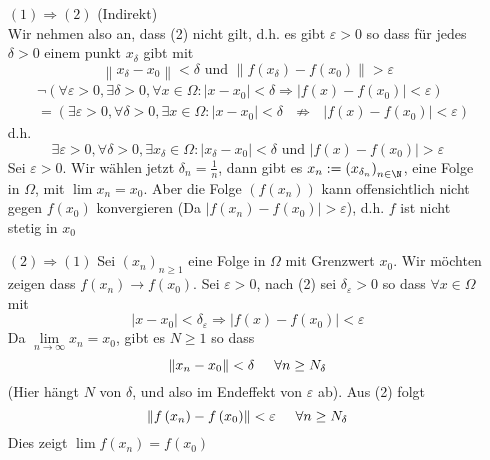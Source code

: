 \begin{beweis}{4.18}
\begin{enumerate}[align=left]
\item[$(1)\Rightarrow (2)$] (Indirekt)\\
Wir nehmen also an, dass (2) nicht gilt, d.h. es gibt $\varepsilon>0$ so dass für jedes $\delta >0$ einem punkt $x_\delta$ gibt mit 
\[\left\| {{x_\delta } - {x_0}} \right\| < \delta {\text{ und }}\left\| {f\left( {{x_\delta }} \right) - f\left( {{x_0}} \right)} \right\| > \varepsilon \]
\begin{align*}
&\neg \left( {\forall \varepsilon  > 0,\exists \delta  > 0,\forall x \in \Omega :\left| {x - {x_0}} \right| < \delta  \Rightarrow \left| {f\left( x \right) - f\left( {{x_0}} \right)} \right| < \varepsilon } \right)\\
 &= \left( {\exists \varepsilon  > 0,\forall \delta  > 0,\exists x \in \Omega :\left| {x - {x_0}} \right| < \delta {\text{ }}\not  \Rightarrow {\text{ }}\left| {f\left( x \right) - f\left( {{x_0}} \right)} \right| < \varepsilon } \right)
\end{align*}
d.h.
\[\exists \varepsilon  > 0,\forall \delta  > 0,\exists {x_\delta } \in \Omega :\left| {{x_\delta } - {x_0}} \right| < \delta {\text{  und  }}\left| {f\left( x \right) - f\left( {{x_0}} \right)} \right| > \varepsilon \]
Sei $\varepsilon>0$. Wir wählen jetzt $\delta_n=\frac{1}{n}$, dann gibt es $x_n:=\left(x_{\delta_n}\right)_{n\in\N}$, eine Folge in $\Omega$, mit $\lim x_n=x_0$. Aber die Folge $\left( f\left( x_n\right)\right)$ kann offensichtlich nicht gegen $f\left( x_0\right)$ konvergieren (Da $\left| {f\left( {{x_n}} \right) - f\left( {{x_0}} \right)} \right| > \varepsilon $), d.h. $f$ ist nicht stetig in $x_0$ 
\item[$(2)\Rightarrow (1)$] Sei $\left( x_n\right)_{n\geq 1}$ eine Folge in $\Omega$ mit Grenzwert $x_0$. Wir möchten zeigen dass $f\left( {{x_n}} \right) \to f\left( {{x_0}} \right)$. Sei $\varepsilon>0$, nach (2) sei $\delta_{\varepsilon}>0$ so dass $\forall x\in\Omega$ mit 
\[\left| {x - {x_0}} \right| < {\delta _\varepsilon } \Rightarrow \left| {f\left( x \right) - f\left( {{x_0}} \right)} \right| < \varepsilon \]
Da $\mathop {\lim }\limits_{n \to \infty } {x_n} = {x_0}$, gibt es $N\geq 1$ so dass 
\[\left\| {{x_n} - {x_0}} \right\| < \delta\hspace{5mm} \forall n \ge {N_\delta }\]
(Hier hängt $N$ von $\delta$, und also im Endeffekt von $\varepsilon$ ab). Aus (2) folgt
\[\left\| {f\left( {{x_n}} \right) - f\left( {{x_0}} \right)} \right\| < \varepsilon \hspace{5mm}\forall n \ge {N_\delta }\]
Dies zeigt $\lim f\left( {{x_n}} \right) = f\left( {{x_0}} \right)$
\end{enumerate}
\end{beweis}

